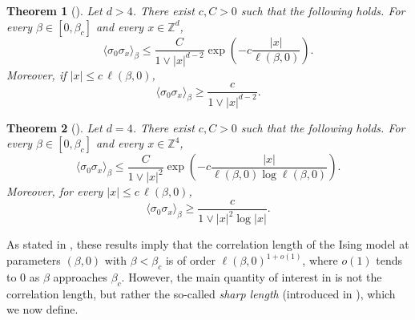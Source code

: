 \documentclass[11pt,a4paper]{article}
\numberwithin{equation}{section}
\theoremstyle{plain}
\newtheorem{Thm}{Theorem}[section]
\theoremstyle{definition}
\begin{document}
\begin{Thm}[]\label{thm:bounds 2pt d>4} Let $d>4$. There exist $c,C>0$ such that the following holds. For every $\beta\in [0,\beta_c]$ and every $x\in \mathbb Z^d$,
\begin{equation}
	\langle \sigma_0\sigma_x\rangle_{\beta}\leq \frac{C}{1\vee |x|^{d-2}}\exp\left(-c\frac{|x|}{\ell(\beta,0)}\right).
\end{equation}
Moreover, if $|x|\leq c\,\ell(\beta,0)$,
\begin{equation}
	\langle \sigma_0\sigma_x\rangle_{\beta}\geq \frac{c}{1\vee |x|^{d-2}}.
\end{equation}
\end{Thm}

\begin{Thm}[]\label{thm:bounds 2pt d=4} Let $d=4$. There exist $c,C>0$ such that the following holds. For every $\beta\in [0,\beta_c]$ and every $x\in \mathbb Z^4$,
\begin{equation}\label{eq:nc upper bound d=4 h=0}
	\langle \sigma_0\sigma_x\rangle_{\beta}\leq \frac{C}{1\vee |x|^{2}}\exp\left(-c\frac{|x|}{\ell(\beta,0)\log \ell(\beta,0)}\right).
\end{equation}
Moreover, for every $|x|\leq c\,\ell(\beta,0)$,
\begin{equation}
	\langle \sigma_0\sigma_x\rangle_{\beta}\geq \frac{c}{1\vee |x|^2\log |x|}.
\end{equation}
\end{Thm}

As stated in \cite[Theorem~1.6]{DuminilPanis2024newLB}, these results imply that the correlation length of the Ising model at parameters $(\beta,0)$ with $\beta<\beta_c$ is of order $\ell(\beta,0)^{1+o(1)}$, where $o(1)$ tends to $0$ as $\beta$ approaches $\beta_c$. However, the main quantity of interest in \cite{DuminilPanis2024newLB} is not the correlation length, but rather the so-called \emph{sharp length} (introduced in \cite{hutchcroft2022derivation,PanisTriviality2023}), which we now define.
\end{document}
